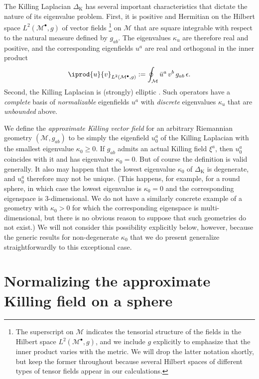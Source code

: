 \documentclass[12pt,letterpaper]{iopart}
\newcommand\Lap[1][K]{\Delta_{\scriptscriptstyle\mathrm{#1}}}
\newcommand\defn[1]{{\slshape #1\/}}
\newcommand\M{\mathcal{M}}
\newcommand\ind{{\bullet}}
\begin{document}
The Killing Laplacian $\Lap$ has several important characteristics that dictate the nature of its eigenvalue problem.  First, it is positive and Hermitian on the Hilbert space $L^2(\M^\ind, g)$ of vector fields\relax
%
\footnote{The superscript on $\M$ indicates the tensorial structure of the fields in the Hilbert space $L^2(\M^\ind, g)$, and we include $g$ explicitly to emphasize that the inner product varies with the metric.  We will drop the latter notation shortly, but keep the former throughout because several Hilbert spaces of different types of tensor fields appear in our calculations.}
%
on $\M$ that are square integrable with respect to the natural measure defined by $g_{ab}$.  The eigenvalues $\kappa_u$ are therefore real and positive, and the corresponding eigenfields $u^a$ are real and orthogonal in the inner product 
%
\begin{equation}\label{ipL2v}
	\iprod{u}{v}_{L^2(\M^\ind, g)} := \oint_\M \bar u^a\, v^b\, g_{ab}\, \epsilon.
\end{equation}
%
Second, the Killing Laplacian is (strongly) elliptic \cite{McLean}.  Such operators have a \textit{complete} basis of \textit{normalizable} eigenfields $u^a$ with \textit{discrete} eigenvalues $\kappa_u$ that are \textit{unbounded} above.

We define the \defn{approximate Killing vector field} for an arbitrary Riemannian geometry $(\M, g_{ab})$ to be simply the eigenfield $u_0^a$ of the Killing Laplacian with the smallest eigenvalue $\kappa_0 \ge 0$.  If $g_{ab}$ admits an actual Killing field $\xi^a$, then $u_0^a$ coincides with it and has eigenvalue $\kappa_0 = 0$.  But of course the definition is valid generally.  It also may happen that the lowest eigenvalue $\kappa_0$ of $\Lap$ is degenerate, and $u_0^a$ therefore may not be unique.  (This happens, for example, for a round sphere, in which case the lowest eigenvalue is $\kappa_0 = 0$ and the corresponding eigenspace is 3-dimensional.  We do not have a similarly concrete example of a geometry with $\kappa_0 > 0$ for which the corresponding eigenspace is multi-dimensional, but there is no obvious reason to suppose that such geometries do not exist.)  We will not consider this possibility explicitly below, however, because the generic results for non-degenerate $\kappa_0$ that we do present generalize straightforwardly to this exceptional case.


\section{Normalizing the approximate Killing field on a sphere}
\end{document}
